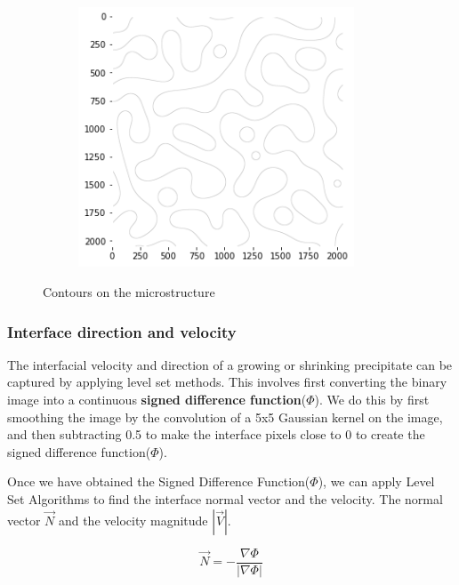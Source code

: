 \documentclass[12pt, a4paper]{report}
\begin{document}
\begin{figure}[H]
\centering
\begin{subfigure}{.6\textwidth}
  \centering
  \includegraphics[width=0.9\textwidth]{Pictures/niceContours.png}
  \label{img:microstrImg}
\end{subfigure}
\caption{Contours on the microstructure}
\label{fig:test}
\end{figure}

\subsubsection{Interface direction and velocity}
The interfacial velocity and direction of a growing or shrinking precipitate can be captured by applying level set methods. This involves first converting the binary image into a continuous \textbf{signed difference function}($\Phi$). We do this by first smoothing the image by the convolution of a 5x5 Gaussian kernel on the image, and then subtracting 0.5 to make the interface pixels close to 0 to create the signed difference function($\Phi$).  

Once we have obtained the Signed Difference Function($\Phi$), we can apply Level Set Algorithms to find the interface normal vector and the velocity. The normal vector $\vec{N}$ and the velocity magnitude $|\vec{V}|$.

\begin{equation}
\vec{N} = -\frac{\nabla\Phi}{|\nabla\Phi|}
\end{equation}
\end{document}
